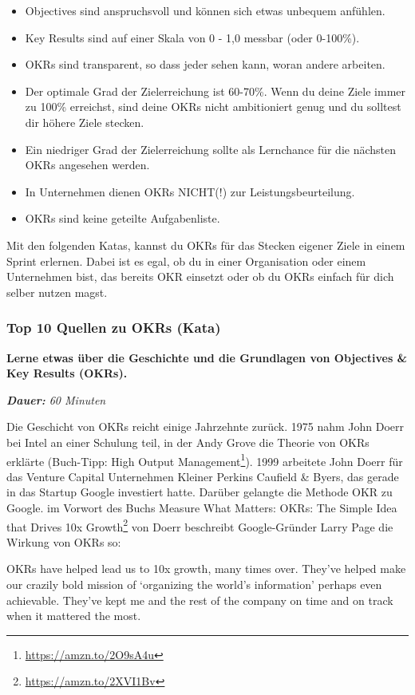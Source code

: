 \documentclass[
  ngerman,
  paper=a4,
,captions=tableheading
]{scrartcl}
\DeclareRobustCommand{\href}[2]{#2\footnote{\url{#1}}}
\providecommand{\tightlist}{%
  \setlength{\itemsep}{0pt}\setlength{\parskip}{0pt}}
\renewenvironment{quote}{\begin{customblockquote}\list{}{\rightmargin=0em\leftmargin=0em}%
\item\relax\color{blockquote-text}\ignorespaces}{\unskip\unskip\endlist\end{customblockquote}}
\begin{document}
\begin{itemize}
\tightlist
\item
  Objectives sind anspruchsvoll und können sich etwas unbequem anfühlen.
\item
  Key Results sind auf einer Skala von 0 - 1,0 messbar (oder 0-100\%).
\item
  OKRs sind transparent, so dass jeder sehen kann, woran andere
  arbeiten.
\item
  Der optimale Grad der Zielerreichung ist 60-70\%. Wenn du deine Ziele
  immer zu 100\% erreichst, sind deine OKRs nicht ambitioniert genug und
  du solltest dir höhere Ziele stecken.
\item
  Ein niedriger Grad der Zielerreichung sollte als Lernchance für die
  nächsten OKRs angesehen werden.
\item
  In Unternehmen dienen OKRs NICHT(!) zur Leistungsbeurteilung.
\item
  OKRs sind keine geteilte Aufgabenliste.
\end{itemize}

Mit den folgenden Katas, kannst du OKRs für das Stecken eigener Ziele in
einem Sprint erlernen. Dabei ist es egal, ob du in einer Organisation
oder einem Unternehmen bist, das bereits OKR einsetzt oder ob du OKRs
einfach für dich selber nutzen magst.

\hypertarget{top-10-quellen-zu-okrs-kata}{%
\subsubsection{Top 10 Quellen zu OKRs
(Kata)}\label{top-10-quellen-zu-okrs-kata}}

\textbf{Lerne etwas über die Geschichte und die Grundlagen von
Objectives \& Key Results (OKRs).}

\emph{\textbf{Dauer:} 60 Minuten}

Die Geschicht von OKRs reicht einige Jahrzehnte zurück. 1975 nahm John
Doerr bei Intel an einer Schulung teil, in der Andy Grove die Theorie
von OKRs erklärte (Buch-Tipp: \href{https://amzn.to/2O9sA4u}{High Output
Management}). 1999 arbeitete John Doerr für das Venture Capital
Unternehmen Kleiner Perkins Caufield \& Byers, das gerade in das Startup
Google investiert hatte. Darüber gelangte die Methode OKR zu Google. im
Vorwort des Buchs \href{https://amzn.to/2XVI1Bv}{Measure What Matters:
OKRs: The Simple Idea that Drives 10x Growth} von Doerr beschreibt
Google-Gründer Larry Page die Wirkung von OKRs so:

\begin{quote}
OKRs have helped lead us to 10x growth, many times over. They've helped
make our crazily bold mission of `organizing the world's information'
perhaps even achievable. They've kept me and the rest of the company on
time and on track when it mattered the most.
\end{quote}
\end{document}
